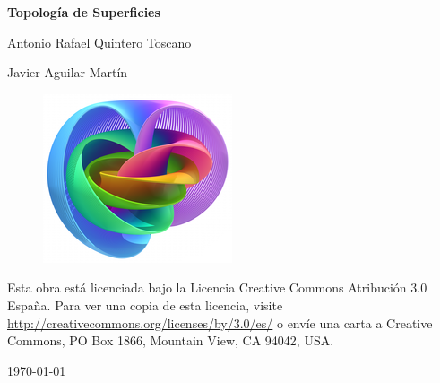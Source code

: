 \documentclass[twoside]{report}
\makeatletter
\theoremstyle{definition}
\renewcommand\tableofcontents{%
  \null\hfill\textbf{\Large\contentsname}\hfill\null\par
  \@mkboth{\MakeUppercase\contentsname}{\MakeUppercase\contentsname}%
  \@starttoc{toc}%
}
\makeatother
\begin{document}

\renewcommand\chaptername{\Huge Tema}

\titleformat{\chapter}[display]
    {\normalfont\huge\bfseries}{\chaptertitlename\ \thechapter}{10pt}{\Huge}
\titlespacing*{\chapter}{0pt}{-1cm}{10pt}



\begin{titlepage}
	\centering
	{\huge\bfseries Topología de Superficies\par}
	\vspace{2cm}
	{\Large Antonio Rafael Quintero Toscano\par}
	{\Large Javier Aguilar Martín\par}
	\vspace{2.5cm}
	\begin{figure}[h!]
		\includegraphics[scale=1.2]{Hopf_Fibration}
	\end{figure}

	\vfill
	Esta obra está licenciada bajo la Licencia Creative Commons Atribución 3.0 España. Para ver una copia de esta licencia, visite \url{http://creativecommons.org/licenses/by/3.0/es/} o envíe una carta a Creative Commons, PO Box 1866, Mountain View, CA 94042, USA.

	{\large \today\par}
\end{titlepage}

\tableofcontents








\end{document}
